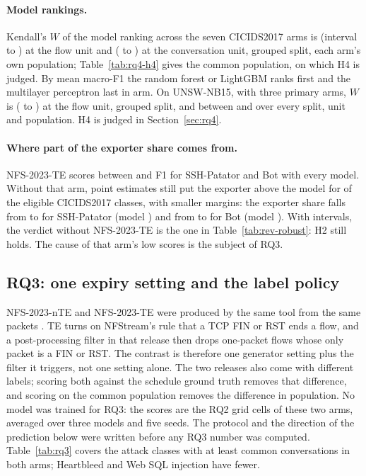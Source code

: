 \documentclass[pdflatex,sn-mathphys-num]{sn-jnl}
\newcommand{\cicids}{CICIDS2017}
\theoremstyle{thmstyleone}%
\theoremstyle{thmstylethree}%
\begin{document}
\paragraph{Model rankings.} Kendall's $W$ of the model ranking across the seven \cicids{} arms is \RQtwoWFlow{} (interval \RQtwoWFlowLo{} to \RQtwoWFlowHi{}) at the flow unit and \RQtwoWConv{} (\RQtwoWConvLo{} to \RQtwoWConvHi{}) at the conversation unit, grouped split, each arm's own population; Table~\ref{tab:rq4-h4} gives the common population, on which H4 is judged. By mean macro-F1 the random forest or LightGBM ranks first and the multilayer perceptron last in \RQtwoMlpLastArms{} arm. On UNSW-NB15, with three primary arms, $W$ is \RQtwoWUnsw{} (\RQtwoWUnswLo{} to \RQtwoWUnswHi{}) at the flow unit, grouped split, and between \RQtwoWUnswMin{} and \RQtwoWUnswMax{} over every split, unit and population. H4 is judged in Section~\ref{sec:rq4}.

\paragraph{Where part of the exporter share comes from.} NFS-2023-TE scores between \RQtwoTeSmallMin{} and \RQtwoTeSmallMax{} F1 for SSH-Patator and Bot with every model. Without that arm, point estimates still put the exporter above the model for \RQtwoLoaoLead{} of the \RQtwoEligibleCic{} eligible \cicids{} classes, with smaller margins: the exporter share falls from \RQtwoSshArm{} to \RQtwoLoaoSshArm{} for SSH-Patator (model \RQtwoLoaoSshModel{}) and from \RQtwoBotArm{} to \RQtwoLoaoBotArm{} for Bot (model \RQtwoLoaoBotModel{}). With intervals, the verdict without NFS-2023-TE is the one in Table~\ref{tab:rev-robust}: H2 still holds. The cause of that arm's low scores is the subject of RQ3.

\subsection{RQ3: one expiry setting and the label policy}\label{sec:rq3}

NFS-2023-nTE and NFS-2023-TE were produced by the same tool from the same packets \cite{pekar2024}. TE turns on NFStream's rule that a TCP FIN or RST ends a flow, and a post-processing filter in that release then drops one-packet flows whose only packet is a FIN or RST. The contrast is therefore one generator setting plus the filter it triggers, not one setting alone. The two releases also come with different labels; scoring both against the schedule ground truth removes that difference, and scoring on the common population removes the difference in population. No model was trained for RQ3: the scores are the RQ2 grid cells of these two arms, averaged over three models and five seeds. The protocol and the direction of the prediction below were written before any RQ3 number was computed. Table~\ref{tab:rq3} covers the \RQthreeClasses{} attack classes with at least \SetMinTest{} common conversations in both arms; Heartbleed and Web SQL injection have fewer.
\end{document}

